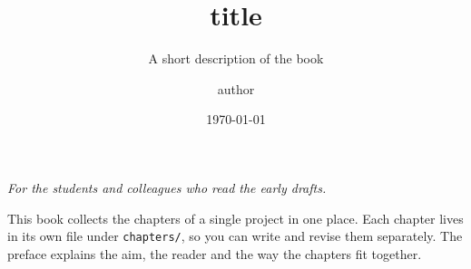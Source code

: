 \documentclass[11pt,a4paper,openright,headings=optiontoc]{scrbook}
\title{{{title}}}
\subtitle{A short description of the book}
\author{{{author}}}
\date{\today}
\begin{document}
\frontmatter
\maketitle

\cleardoublepage
\thispagestyle{empty}
\vspace*{\fill}
\begin{center}
  \itshape For the students and colleagues who read the early drafts.
\end{center}
\vspace{\fill}

\cleardoublepage
\tableofcontents


This book collects the chapters of a single project in one place. Each chapter lives in its own file under \texttt{chapters/}, so you can write and revise them separately. The preface explains the aim, the reader and the way the chapters fit together.

\mainmatter





\appendix


\backmatter



\end{document}
